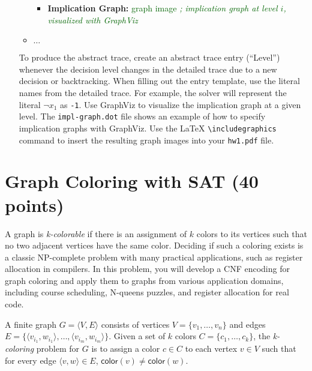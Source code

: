 \documentclass{article}
\begin{document}
\begin{enumerate}
\begin{itemize}
\begin{itemize}
			\item \textbf{Implication Graph:} \textcolor{DarkGreen}{graph image} \hfill{\textcolor{DarkGreen}{\emph{; implication graph at level $i$, visualized with GraphViz}}}
			
		\end{itemize}
		\item $\ldots$
	\end{itemize}
	
	To produce the abstract trace, create an abstract trace  entry (``Level'') whenever the decision level changes in the detailed trace due to a new decision or backtracking. When filling out the entry template, use the literal names from the detailed trace. For example, the solver will represent the literal $\neg x_1$ as \texttt{-1}. Use GraphViz to visualize the implication graph at a given level. The \texttt{impl-graph.dot} file shows an example of how to specify implication graphs with GraphViz. Use the LaTeX \texttt{\textbackslash includegraphics} command to insert the resulting graph images into your \texttt{hw1.pdf} file.
	
	
	
	
	
\end{enumerate}

\section{Graph Coloring with SAT (40 points)}\label{coloring}

A graph is \emph{k-colorable} if there is an assignment of $k$ colors to its vertices such that no two adjacent vertices have the same color.  Deciding if such a coloring exists is a classic NP-complete problem with many practical applications, such as register allocation in compilers.  In this problem, you will develop a CNF encoding for graph coloring and apply them to graphs from various application domains, including course scheduling, N-queens puzzles, and register allocation for real code.

A finite graph $G = \langle V, E\rangle$ consists of vertices $V=\{v_1,\ldots,v_n\}$ and edges $E=\{\langle v_{i_1}, w_{i_1}\rangle,\ldots,\langle v_{i_m}, w_{i_m}\rangle\}$.  Given a set of $k$ colors $C=\{c_1,\ldots,c_k\}$, the \emph{k-coloring} problem for $G$ is to assign a color $c\in C$  to each vertex $v\in V$ such that for every edge $\langle v,w\rangle\in E$, $\mathsf{color}(v)\neq\mathsf{color}(w)$.
\end{document}
